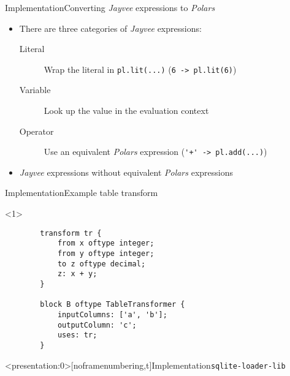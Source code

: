 \begin{frame}[t]{Implementation}{Converting \emph{Jayvee} expressions to \emph{Polars}}
	\begin{itemize}
		\item There are three categories of \emph{Jayvee} expressions\footnotemark[1]:
		      \begin{description}
			      \item[Literal] Wrap the literal in \Verb|pl.lit(...)| (\Verb|6 -> pl.lit(6)|)
			      \item[Variable] Look up the value in the evaluation context
			      \item[Operator] Use an equivalent \emph{Polars} expression (\Verb|'+' -> pl.add(...)|)
		      \end{description}
		\item<2-> \emph{Jayvee} expressions without equivalent \emph{Polars} expressions
	\end{itemize}

\end{frame}
\begin{frame}[fragile]{Implementation}{Example table transform}
	\begin{onlyenv}
		\begin{lstlisting}
		transform tr {
			from x oftype integer;
			from y oftype integer;
			to z oftype decimal;
			z: x + y;
		}

		block B oftype TableTransformer {
			inputColumns: ['a', 'b'];
			outputColumn: 'c';
			uses: tr;
		}
		\end{lstlisting}
	\end{onlyenv}
	 {
		\begin{figure}
			
		\end{figure}
	}
\end{frame}
\begin{frame}<presentation:0>[noframenumbering,t]{Implementation}{\Verb|sqlite-loader-lib|}
	\begin{figure}
		
	\end{figure}
\end{frame}
